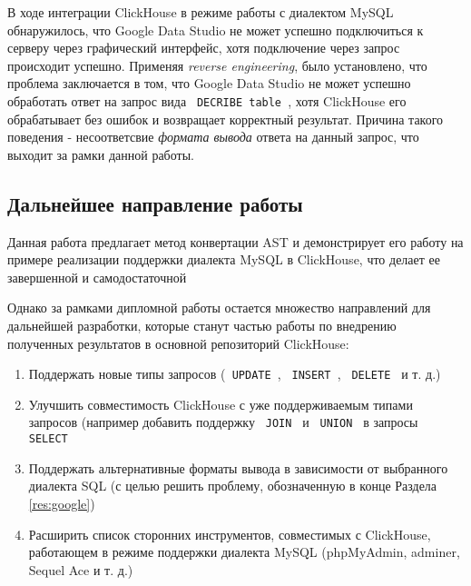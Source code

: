 В ходе интеграции ClickHouse в режиме работы с диалектом MySQL обнаружилось, что Google Data Studio не может успешно подключиться к серверу через графический интерфейс, хотя подключение через запрос происходит успешно. Применяя \textit{reverse engineering}, было установлено, что проблема заключается в том, что Google Data Studio не может успешно обработать ответ на запрос вида \texttt{ DECRIBE table }, хотя ClickHouse его обрабатывает без ошибок и возвращает корректный результат. Причина такого поведения - несоответсвие \textit{формата вывода} ответа на данный запрос, что выходит за рамки данной работы. 

\subsection{Дальнейшее направление работы}
Данная работа предлагает метод конвертации AST и демонстрирует его работу на примере реализации поддержки диалекта MySQL в ClickHouse, что делает ее завершенной и самодостаточной

Однако за рамками дипломной работы остается множество направлений для дальнейшей разработки, которые станут частью работы по внедрению полученных результатов в основной репозиторий ClickHouse:
\begin{enumerate}
    \item Поддержать новые типы запросов (\texttt{ UPDATE }, \texttt{ INSERT }, \texttt{ DELETE } и т. д.)
    \item Улучшить совместимость ClickHouse с уже поддерживаемым типами запросов (например добавить поддержку \texttt{ JOIN } и \texttt{ UNION } в запросы \texttt{ SELECT }
    \item Поддержать альтернативные форматы вывода в зависимости от выбранного диалекта SQL (с целью решить проблему, обозначенную в конце Раздела \ref{res:google})
    \item Расширить список сторонних инструментов, совместимых с ClickHouse, работающем в режиме поддержки диалекта MySQL (phpMyAdmin, adminer, Sequel Ace и т. д.)
\end{enumerate}
